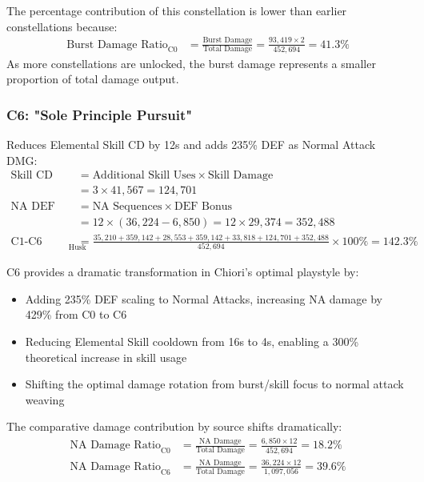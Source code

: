 \documentclass[12pt,a4paper]{article}
\begin{document}
The percentage contribution of this constellation is lower than earlier constellations because:
\begin{align}
\text{Burst Damage Ratio}_{\text{C0}} &= \frac{\text{Burst Damage}}{\text{Total Damage}} = \frac{93,419 \times 2}{452,694} = 41.3\%
\end{align}
As more constellations are unlocked, the burst damage represents a smaller proportion of total damage output.

\subsubsection{C6: "Sole Principle Pursuit"}
Reduces Elemental Skill CD by 12s and adds 235\% DEF as Normal Attack DMG:
\begin{align}
\text{Skill CD Reduction Benefit} &= \text{Additional Skill Uses} \times \text{Skill Damage} \\
&= 3 \times 41,567 = 124,701 \\
\text{NA DEF Scaling Benefit} &= \text{NA Sequences} \times \text{DEF Bonus} \\
&= 12 \times (36,224 - 6,850) = 12 \times 29,374 = 352,488 \\
\text{C1-C6 Damage Increase}_{\text{Husk}} &= \frac{35,210 + 359,142 + 28,553 + 359,142 + 33,818 + 124,701 + 352,488}{452,694} \times 100\% = 142.3\%
\end{align}

C6 provides a dramatic transformation in Chiori's optimal playstyle by:
\begin{itemize}
    \item Adding 235\% DEF scaling to Normal Attacks, increasing NA damage by 429\% from C0 to C6
    \item Reducing Elemental Skill cooldown from 16s to 4s, enabling a 300\% theoretical increase in skill usage
    \item Shifting the optimal damage rotation from burst/skill focus to normal attack weaving
\end{itemize}

The comparative damage contribution by source shifts dramatically:
\begin{align}
\text{NA Damage Ratio}_{\text{C0}} &= \frac{\text{NA Damage}}{\text{Total Damage}} = \frac{6,850 \times 12}{452,694} = 18.2\% \\
\text{NA Damage Ratio}_{\text{C6}} &= \frac{\text{NA Damage}}{\text{Total Damage}} = \frac{36,224 \times 12}{1,097,056} = 39.6\%
\end{align}
\end{document}
